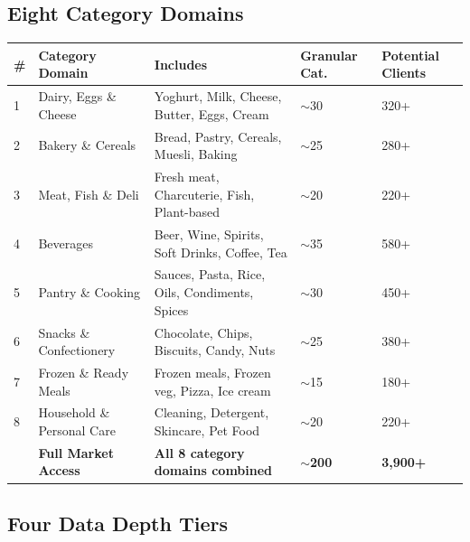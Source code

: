 \documentclass[11pt,a4paper]{article}
\begin{document}
\subsection{Eight Category Domains}

\begin{center}
\renewcommand{\arraystretch}{1.35}
\begin{tabularx}{\textwidth}{C{0.6cm} L{3.8cm} L{5cm} R{1.5cm} R{2.5cm}}
\toprule
{}
\textbf{\color{white}\#} & \textbf{\color{white}Category Domain} & \textbf{\color{white}Includes} & \textbf{\color{white}Granular Cat.} & \textbf{\color{white}Potential Clients} \\
 & Dairy, Eggs \& Cheese & Yoghurt, Milk, Cheese, Butter, Eggs, Cream & $\sim$30 & 320+ \\
2 & Bakery \& Cereals & Bread, Pastry, Cereals, Muesli, Baking & $\sim$25 & 280+ \\
3 & Meat, Fish \& Deli & Fresh meat, Charcuterie, Fish, Plant-based & $\sim$20 & 220+ \\
4 & Beverages & Beer, Wine, Spirits, Soft Drinks, Coffee, Tea & $\sim$35 & 580+ \\
5 & Pantry \& Cooking & Sauces, Pasta, Rice, Oils, Condiments, Spices & $\sim$30 & 450+ \\
6 & Snacks \& Confectionery & Chocolate, Chips, Biscuits, Candy, Nuts & $\sim$25 & 380+ \\
7 & Frozen \& Ready Meals & Frozen meals, Frozen veg, Pizza, Ice cream & $\sim$15 & 180+ \\
8 & Household \& Personal Care & Cleaning, Detergent, Skincare, Pet Food & $\sim$20 & 220+ \\
\midrule
& \textbf{Full Market Access} & \textbf{All 8 category domains combined} & \textbf{$\sim$200} & \textbf{3,900+} \\
\bottomrule
\end{tabularx}
\end{center}

\subsection{Four Data Depth Tiers}
\end{document}
